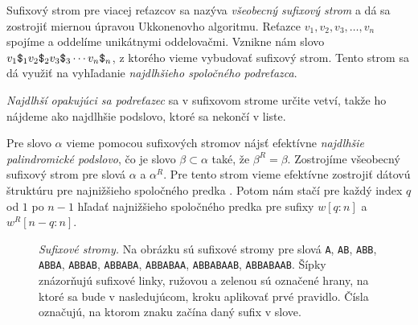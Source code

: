 Sufixový strom pre viacej reťazcov sa nazýva \emph{všeobecný sufixový strom} 
a dá sa zostrojiť miernou úpravou Ukkonenovho algoritmu. Reťazce $v_1, v_2, 
v_3, \ldots, v_n$ spojíme a oddelíme unikátnymi oddelovačmi. Vznikne nám slovo 
$v_1\hbox{\tt\$}_1v_2\hbox{\tt\$}_2v_3\hbox{\tt\$}_3\cdots v_n\hbox{\tt\$}_n$, z ktorého vieme vybudovať sufixový 
strom. Tento strom sa dá využiť na vyhľadanie \emph{najdlhšieho spoločného 
podreťazca}. 

\emph{Najdlhší opakujúci sa podreťazec} sa v sufixovom strome určite vetví, 
takže ho nájdeme ako najdlhšie podslovo, ktoré sa nekončí v liste.

Pre slovo $\alpha$ vieme pomocou sufixových stromov nájsť efektívne 
\emph{najdlhšie palindromické podslovo}, čo je slovo $\beta \subset \alpha$ 
také, že $\beta^R = \beta$. Zostrojíme všeobecný sufixový strom pre slová 
$\alpha$ a $\alpha^R$. Pre tento strom vieme efektívne zostrojiť dátovú 
štruktúru pre najnižšieho spoločného predka \citep{lca}. Potom nám stačí 
pre každý index $q$ od $1$ po $n-1$ hľadať najnižšieho spoločného predka pre 
sufixy $w[q:n]$ a $w^R[n-q:n]$.

\def\wThr{0.78}
\begin{figure}
\centering
{}
\quad
{}
\quad
{}
\quad
{}

{}
\quad
{}
\qquad
{}

{}
\quad
{}
\caption{\emph{Sufixové stromy.} Na obrázku sú sufixové stromy pre slová 
{\tt A}, {\tt AB}, {\tt ABB}, {\tt ABBA}, {\tt ABBAB}, 
{\tt ABBABA}, {\tt ABBABAA}, {\tt ABBABAAB}, {\tt ABBABAAB\uz}. Šípky 
znázorňujú sufixové linky, ružovou a zelenou sú označené hrany, na ktoré 
sa bude v nasledujúcom, kroku aplikovať prvé pravidlo. Čísla označujú, na 
ktorom znaku začína daný sufix v slove.}
\label{img:sxsx}
\end{figure}

